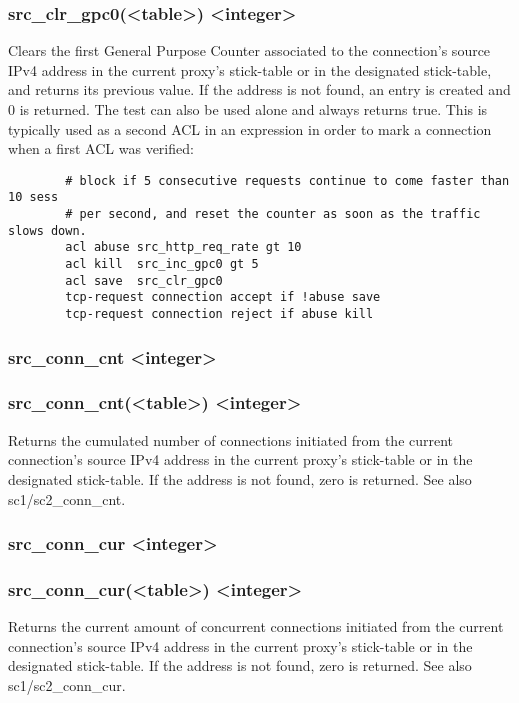 \subsubsection*{src\_clr\_gpc0(<table>) <integer>}
  Clears the first General Purpose Counter associated to the connection's
  source IPv4 address in the current proxy's stick-table or in the designated
  stick-table, and returns its previous value. If the address is not found, an
  entry is created and 0 is returned. The test can also be used alone and
  always returns true. This is typically used as a second ACL in an expression
  in order to mark a connection when a first ACL was verified:

\begin{verbatim}
        # block if 5 consecutive requests continue to come faster than 10 sess
        # per second, and reset the counter as soon as the traffic slows down.
        acl abuse src_http_req_rate gt 10
        acl kill  src_inc_gpc0 gt 5
        acl save  src_clr_gpc0
        tcp-request connection accept if !abuse save
        tcp-request connection reject if abuse kill
\end{verbatim}

\subsubsection[src\_conn\_cnt]{src\_conn\_cnt <integer>}
\subsubsection*{src\_conn\_cnt(<table>) <integer>}
  Returns the cumulated number of connections initiated from the current
  connection's source IPv4 address in the current proxy's stick-table or in
  the designated stick-table. If the address is not found, zero is returned.
  See also sc1/sc2\_conn\_cnt.

\subsubsection[src\_conn\_cur]{src\_conn\_cur <integer>}
\subsubsection*{src\_conn\_cur(<table>) <integer>}


  Returns the current amount of concurrent connections initiated from the
  current connection's source IPv4 address in the current proxy's stick-table
  or in the designated stick-table. If the address is not found, zero is
  returned. See also sc1/sc2\_conn\_cur.

